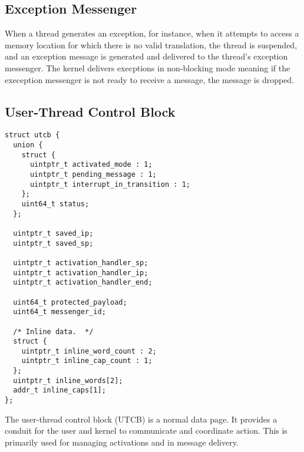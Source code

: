 \subsection{Exception Messenger}

When a thread generates an exception, for instance, when it attempts
to access a memory location for which there is no valid translation,
the thread is suspended, and an exception message is generated and
delivered to the thread's exception messenger.  The kernel delivers
execptions in non-blocking mode meaning if the exeception messenger is
not ready to receive a message, the message is dropped.

\subsection{User-Thread Control Block}

\begin{lstlisting}[float,caption=The user-thread control block structure.,frame=single,captionpos=b]
struct utcb {
  union {
    struct {
      uintptr_t activated_mode : 1;
      uintptr_t pending_message : 1;
      uintptr_t interrupt_in_transition : 1;
    };
    uint64_t status;
  };

  uintptr_t saved_ip;
  uintptr_t saved_sp;

  uintptr_t activation_handler_sp;
  uintptr_t activation_handler_ip;
  uintptr_t activation_handler_end;

  uint64_t protected_payload;
  uint64_t messenger_id;

  /* Inline data.  */
  struct {
    uintptr_t inline_word_count : 2;
    uintptr_t inline_cap_count : 1;
  };
  uintptr_t inline_words[2];
  addr_t inline_caps[1];
};
\end{lstlisting}

The user-thread control block (UTCB) is a normal data page.  It
provides a conduit for the user and kernel to communicate and
coordinate action.  This is primarily used for managing activations
and in message delivery.

